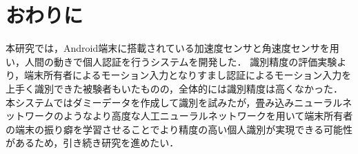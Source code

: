 \section{おわりに}
本研究では，Android端末に搭載されている加速度センサと角速度センサを用い，人間の動きで個人認証を行うシステムを開発した．
識別精度の評価実験より，端末所有者によるモーション入力となりすまし認証によるモーション入力を上手く識別できた被験者もいたものの，全体的には識別精度は高くなかった．
本システムではダミーデータを作成して識別を試みたが，畳み込みニューラルネットワークのようなより高度な人工ニューラルネットワークを用いて端末所有者の端末の振り癖を学習させることでより精度の高い個人識別が実現できる可能性があるため，引き続き研究を進めたい．
